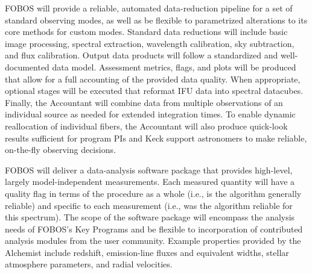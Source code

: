 \documentclass[oneside,11pt]{amsart}
\begin{document}
 FOBOS will provide a reliable, automated
data-reduction pipeline for a set of standard observing modes, as well
as be flexible to parametrized alterations to its core methods for
custom modes.  Standard data reductions will include basic image
processing, spectral extraction, wavelength calibration, sky
subtraction, and flux calibration.  Output data products will follow a
standardized and well-documented data model.  Assessment metrics, flags,
and plots will be produced that allow for a full accounting of the
provided data quality.  When appropriate, optional stages will be
executed that reformat IFU data into spectral datacubes.  Finally, the
Accountant will combine data from multiple observations of an individual
source as needed for extended integration times.  To enable dynamic
reallocation of individual fibers, the Accountant will also produce
quick-look results sufficient for program PIs and Keck support
astronomers to make reliable, on-the-fly observing decisions.


\smallskip

 FOBOS will deliver a data-analysis
software package that provides high-level, largely model-independent
measurements.  Each measured quantity will have a quality flag in terms
of the procedure as a whole (i.e., is the algorithm generally reliable)
and specific to each measurement (i.e., was the algorithm reliable for
this spectrum).  The scope of the software package will encompass the
analysis needs of FOBOS’s Key Programs and be flexible to incorporation
of contributed analysis modules from the user community. Example
properties provided by the Alchemist include redshift, emission-line
fluxes and equivalent widths, stellar atmosphere parameters, and radial
velocities.

\smallskip
\end{document}
